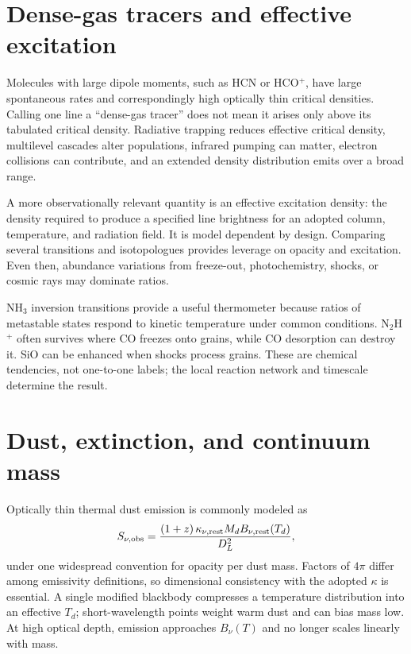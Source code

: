 \section{Dense-gas tracers and effective excitation}

Molecules with large dipole moments, such as HCN or HCO$^+$, have large spontaneous
rates and correspondingly high optically thin critical densities.  Calling one line
a ``dense-gas tracer'' does not mean it arises only above its tabulated critical
density.  Radiative trapping reduces effective critical density, multilevel cascades
alter populations, infrared pumping can matter, electron collisions can contribute,
and an extended density distribution emits over a broad range.

A more observationally relevant quantity is an effective excitation density: the
density required to produce a specified line brightness for an adopted column,
temperature, and radiation field.  It is model dependent by design.  Comparing
several transitions and isotopologues provides leverage on opacity and excitation.
Even then, abundance variations from freeze-out, photochemistry, shocks, or cosmic
rays may dominate ratios.

NH$_3$ inversion transitions provide a useful thermometer because ratios of
metastable states respond to kinetic temperature under common conditions.  N$_2$H$^+$
often survives where CO freezes onto grains, while CO desorption can destroy it.
SiO can be enhanced when shocks process grains.  These are chemical tendencies, not
one-to-one labels; the local reaction network and timescale determine the result.

\section{Dust, extinction, and continuum mass}

Optically thin thermal dust emission is commonly modeled as
\begin{equation}
 S_{\nu,\rm obs}=\frac{(1+z)\,\kappa_{\nu,\rm rest}
 M_dB_{\nu,\rm rest}(T_d)}{D_L^2},
 \label{eq:dust-mass-flux}
\end{equation}
under one widespread convention for opacity per dust mass.  Factors of $4\pi$ differ
among emissivity definitions, so dimensional consistency with the adopted $\kappa$
is essential.  A single modified blackbody compresses a temperature distribution
into an effective $T_d$; short-wavelength points weight warm dust and can bias mass
low.  At high optical depth, emission approaches $B_\nu(T)$ and no longer scales
linearly with mass.

